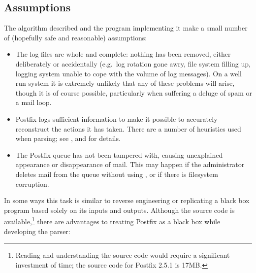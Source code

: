 \subsection{Assumptions}

The algorithm described and the program implementing it make a small number
of (hopefully safe and reasonable) assumptions:

\begin{itemize}

    \item The log files are whole and complete: nothing has been removed,
        either deliberately or accidentally (e.g.\ log rotation gone awry,
        file system filling up, logging system unable to cope with the
        volume of log messages).  On a well run system it is extremely
        unlikely that any of these problems will arise, though it is of
        course possible, particularly when suffering a deluge of spam or a
        mail loop.

    \item Postfix logs sufficient information to make it possible to
        accurately reconstruct the actions it has taken.  There are a
        number of heuristics used when parsing; see
        ,
         and  for details.

    \item The Postfix queue has not been tampered with, causing unexplained
        appearance or disappearance of mail.  This may happen if the
        administrator deletes mail from the queue without using 
        , or if there is filesystem corruption.

\end{itemize}

In some ways this task is similar to reverse engineering or replicating a
black box program based solely on its inputs and outputs.  Although the
source code is available,\footnote{Reading and understanding the source
code would require a significant investment of time; the source code for
Postfix 2.5.1 is 17MB.} there are advantages to treating Postfix as a black
box while developing the parser:

